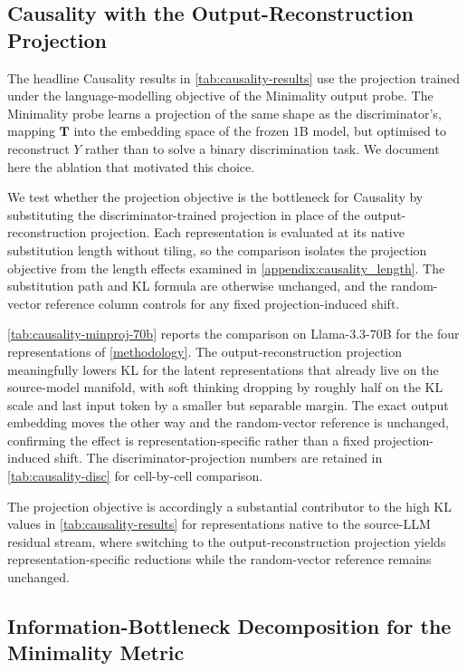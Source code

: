 \subsection{Causality with the Output-Reconstruction Projection}
\label{appendix:sub:causality_minproj}


The headline Causality results in \cref{tab:causality-results} use the projection trained under the language-modelling objective of the Minimality output probe. The Minimality probe learns a projection of the same shape as the discriminator's, mapping $\mathbf{T}$ into the embedding space of the frozen $1$B model, but optimised to reconstruct $Y$ rather than to solve a binary discrimination task. We document here the ablation that motivated this choice.

We test whether the projection objective is the bottleneck for Causality by substituting the discriminator-trained projection in place of the output-reconstruction projection. Each representation is evaluated at its native substitution length without tiling, so the comparison isolates the projection objective from the length effects examined in \cref{appendix:causality_length}. The substitution path and KL formula are otherwise unchanged, and the random-vector reference column controls for any fixed projection-induced shift.

\cref{tab:causality-minproj-70b} reports the comparison on Llama-3.3-70B for the four representations of \cref{methodology}. The output-reconstruction projection meaningfully lowers KL for the latent representations that already live on the source-model manifold, with soft thinking dropping by roughly half on the KL scale and last input token by a smaller but separable margin. The exact output embedding moves the other way and the random-vector reference is unchanged, confirming the effect is representation-specific rather than a fixed projection-induced shift. The discriminator-projection numbers are retained in \cref{tab:causality-disc} for cell-by-cell comparison.



The projection objective is accordingly a substantial contributor to the high KL values in \cref{tab:causality-results} for representations native to the source-LLM residual stream, where switching to the output-reconstruction projection yields representation-specific reductions while the random-vector reference remains unchanged.

\subsection{Information-Bottleneck Decomposition for the Minimality Metric}
\label{appendix:sub:minimality_ib_derivation}


